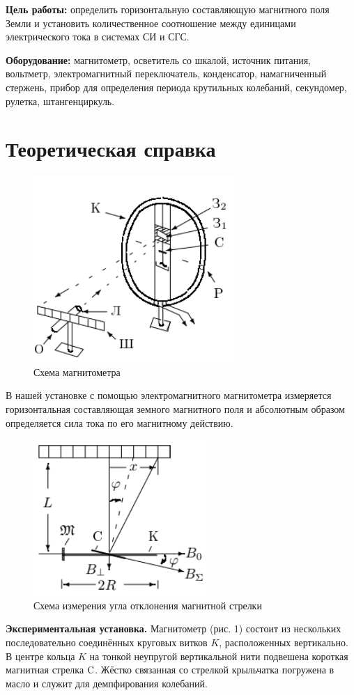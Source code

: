 \documentclass[a4paper,12pt]{article} %
\theoremstyle{plain} %
\theoremstyle{definition} %
\theoremstyle{remark} %
\begin{document}

\newpage
\textbf{Цель работы:} определить горизонтальную составляющую магнитного поля Земли и установить количественное соотношение между
единицами электрического тока в системах СИ и СГС.

\textbf{Оборудование:} магнитометр, осветитель со шкалой, источник питания, вольтметр, электромагнитный переключатель, конденсатор, намагниченный стержень, прибор для определения периода
крутильных колебаний, секундомер, рулетка, штангенциркуль.

\section{Теоретическая справка}


\begin{figure}
\includegraphics[scale=1]{magnet_scheme}
\caption{Схема магнитометра}
\end{figure}

В нашей установке с помощью
электромагнитного магнитометра измеряется горизонтальная составляющая земного магнитного поля и абсолютным образом определяется сила
тока по его магнитному действию.

\begin{figure}
\includegraphics[scale=1]{magnet_angle}
\centering
\caption{{\small Схема измерения угла отклонения магнитной стрелки}}
\end{figure}
\textbf{Экспериментальная установка.}
Магнитометр (рис. 1) состоит из
нескольких последовательно соединённых круговых витков $K$, расположенных вертикально. В центре кольца $K$ на тонкой неупругой вертикальной нити подвешена короткая магнитная стрелка \textbf{$\rm C$}. Жёстко связанная со стрелкой крыльчатка погружена в масло и служит для демпфирования колебаний.
\end{document}
